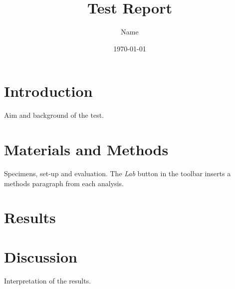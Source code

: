 \documentclass[11pt,a4paper]{article}
\title{Test Report}
\author{Name}
\date{\today}
\begin{document}
\maketitle

\section{Introduction}
Aim and background of the test.

\section{Materials and Methods}
Specimens, set-up and evaluation. The \emph{Lab} button in the toolbar inserts a
methods paragraph from each analysis.

\section{Results}

\section{Discussion}
Interpretation of the results.

\printbibliography
\end{document}
